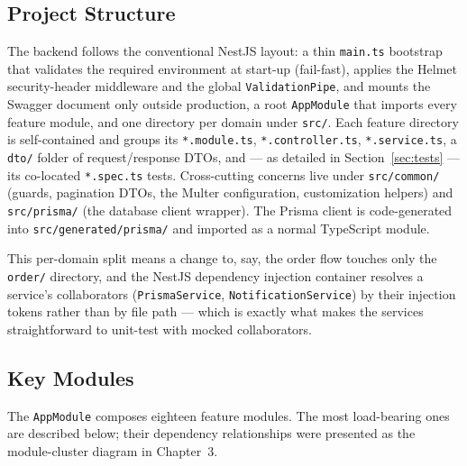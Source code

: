 \documentclass[12pt, a4paper, oneside]{report}
\begin{document}
\subsection{Project Structure}

The backend follows the conventional NestJS layout: a thin
\texttt{main.ts} bootstrap that validates the required environment at
start-up (fail-fast), applies the Helmet security-header middleware and
the global \texttt{ValidationPipe}, and mounts the Swagger document only
outside production, a root
\texttt{AppModule} that imports every feature module, and one
directory per domain under \texttt{src/}. Each feature directory is
self-contained and groups its \texttt{*.module.ts},
\texttt{*.controller.ts}, \texttt{*.service.ts}, a \texttt{dto/}
folder of request/response DTOs, and --- as detailed in
Section~\ref{sec:tests} --- its co-located \texttt{*.spec.ts} tests. Cross-cutting
concerns live under \texttt{src/common/} (guards, pagination DTOs,
the Multer configuration, customization helpers) and
\texttt{src/prisma/} (the database client wrapper). The Prisma client
is code-generated into \texttt{src/generated/prisma/} and imported as
a normal TypeScript module.

This per-domain split means a change to, say, the order flow touches
only the \texttt{order/} directory, and the NestJS dependency
injection container resolves a service's collaborators
(\texttt{PrismaService}, \texttt{NotificationService}) by their
injection tokens rather than by file path --- which is exactly what
makes the services straightforward to unit-test with mocked
collaborators.

\subsection{Key Modules}

The \texttt{AppModule} composes eighteen feature modules. The most
load-bearing ones are described below; their dependency relationships
were presented as the module-cluster diagram in Chapter~3.
\end{document}
